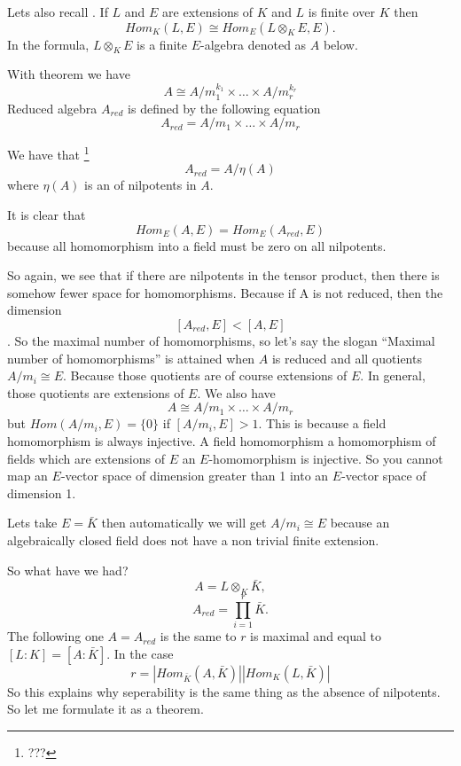 Lets also recall . If $L$ and $E$ are
extensions of $K$ and $L$ is finite over $K$ then
\[
Hom_K\left(L, E\right) \cong
Hom_E\left(
L \otimes_K E, E
\right).
\]
In the formula, $L \otimes_K E$ is a finite $E$-algebra denoted as $A$
below.

\begin{definition}
  With  theorem we have
  \[
  A \cong A/m_1^{k_1} \times \dots \times A/m_r^{k_r}
  \]
  Reduced algebra $A_{red}$ is defined by the following equation
  \[
  A_{red} = A/m_1 \times \dots \times A/m_r
  \]
  \label{def:reducedalgebra}
\end{definition}

We have that
\footnote{
  ???
}
\[
A_{red} = A /\eta\left(A\right)
\]
where $\eta\left(A\right)$ is an  of
nilpotents in $A$.

It is clear that
\[
Hom_E\left(A, E\right) =
Hom_E\left(A_{red}, E\right)
\]
because all homomorphism into a field must be zero on all nilpotents. 

So again, we see that if there are nilpotents in the tensor product,
then there is somehow fewer space for homomorphisms. Because if A is
not reduced, then the dimension
\[
\left[A_{red}, E\right] < \left[A, E\right]
\].  
So the maximal number of homomorphisms, so let's say the slogan
``Maximal number of homomorphisms'' is attained when $A$ is reduced
and all quotients $A/m_i \cong E$.
Because those quotients are of course extensions of $E$. In general,   
those quotients are extensions of $E$. We also have
\[
A \cong A/m_1 \times \dots \times A/m_r
\]
but $Hom\left(A/m_i, E\right) = \{0\}$ if $\left[A/m_i, E\right] > 1$.  
This is because a field homomorphism is always injective. A field
homomorphism a homomorphism of fields which are extensions of $E$  an
$E$-homomorphism is injective. So you cannot map an $E$-vector space of
dimension greater than 1 into an $E$-vector space of dimension 1.

Lets take $E = \bar{K}$ then automatically we will get
$A/m_i \cong E$ because an algebraically closed field does not have a
non trivial finite extension.

So what have we had?
\[
A = L \otimes_K \bar{K},
\]
\[
A_{red} = \prod_{i=1}^r \bar{K}.
\]
The following one $A = A_{red}$ is the same to $r$ is maximal and
equal to $\left[L:K\right] = \left[A: \bar{K}\right]$. In the case
\[
r = \left|Hom_{\bar{K}}\left(A, \bar{K}\right)\right|
\left|Hom_K\left(L, \bar{K}\right)\right|
\]
So this explains why seperability is the same thing as the absence of
nilpotents. So let me formulate it as a theorem.

